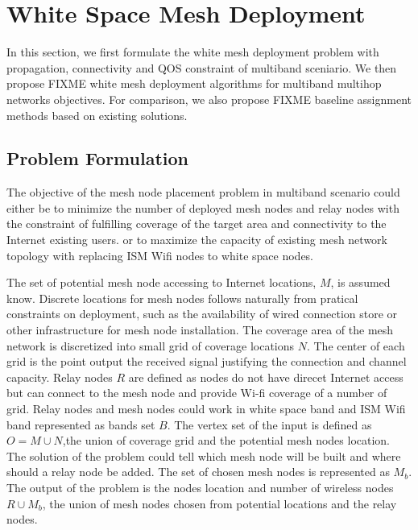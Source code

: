 \section{White Space Mesh Deployment}
\label{sec:model}

In this section, we first formulate the 
white mesh deployment problem
with propagation, connectivity and QOS constraint of multiband sceniario.
We then propose {FIXME} white mesh deployment algorithms for multiband multihop networks objectives.
For comparison, we also propose {FIXME} baseline assignment methods based on existing solutions.

\subsection{Problem Formulation}
The objective of the mesh node placement problem in multiband scenario could either be 
to minimize the number of deployed mesh nodes and relay nodes with the constraint of fulfilling coverage of the target area and connectivity to the Internet existing users. 
or to maximize the capacity of existing mesh network topology with replacing ISM Wifi nodes to white space nodes.

The set of potential mesh node accessing to Internet locations, $M$, is assumed know. 
Discrete locations for mesh nodes follows naturally from pratical constraints on deployment, such as the availability of wired connection store or other infrastructure for mesh node installation.
The coverage area of the mesh network is discretized into small grid of coverage locations $N$. The center of each grid is the point output the received signal justifying the connection and channel capacity.
Relay nodes $R$  are defined as nodes do not have direcet Internet access but can connect to the mesh node and provide Wi-fi coverage of a number of grid.
Relay nodes and mesh nodes could work in white space band and ISM Wifi band represented as bands set $B$.
The vertex set of the input is defined as $O=M\cup N$,the union of  coverage grid and the potential mesh nodes location. 
The solution of the problem could tell which mesh node will be built and where should a relay node be added. The set of chosen mesh nodes is represented as $M_b$. 
The output of the problem is the nodes location and number of wireless nodes $R\cup M_b$, the union of mesh nodes chosen from potential locations and the relay nodes. 


